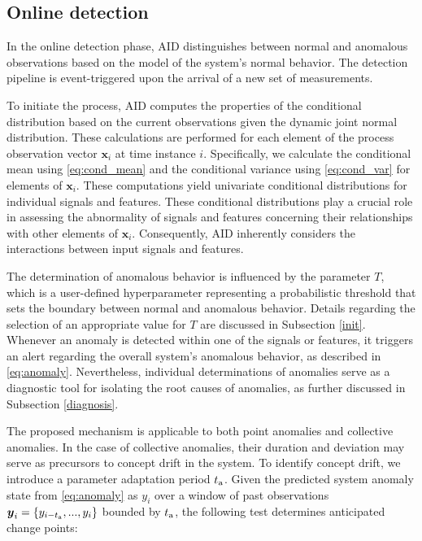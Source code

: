 \subsection{Online detection}\label{detect}
In the online detection phase, AID distinguishes between normal and anomalous observations based on the model of the system's normal behavior. The detection pipeline is event-triggered upon the arrival of a new set of measurements.

To initiate the process, AID computes the properties of the conditional distribution based on the current observations given the dynamic joint normal distribution. These calculations are performed for each element of the process observation vector $\boldsymbol{x}_i$ at time instance $i$. Specifically, we calculate the conditional mean using \eqref{eq:cond_mean} and the conditional variance using \eqref{eq:cond_var} for elements of $\boldsymbol{x}_i$. These computations yield univariate conditional distributions for individual signals and features. These conditional distributions play a crucial role in assessing the abnormality of signals and features concerning their relationships with other elements of $\boldsymbol{x}_i$. Consequently, AID inherently considers the interactions between input signals and features.

The determination of anomalous behavior is influenced by the parameter $T$, which is a user-defined hyperparameter representing a probabilistic threshold that sets the boundary between normal and anomalous behavior. Details regarding the selection of an appropriate value for $T$ are discussed in Subsection \ref{init}. Whenever an anomaly is detected within one of the signals or features, it triggers an alert regarding the overall system's anomalous behavior, as described in \eqref{eq:anomaly}. Nevertheless, individual determinations of anomalies serve as a diagnostic tool for isolating the root causes of anomalies, as further discussed in Subsection \ref{diagnosis}.

The proposed mechanism is applicable to both point anomalies and collective anomalies. In the case of collective anomalies, their duration and deviation may serve as precursors to concept drift in the system. To identify concept drift, we introduce a parameter adaptation period $t _{\text{a}}$. Given the predicted system anomaly state from \eqref{eq:anomaly} as $y_i$ over a window of past observations \(\boldsymbol{y}_i=\{y_{i-t _{\text{a}}},...,y_{i}\}\) bounded by $t _{\text{a}}$, the following test determines anticipated change points:

